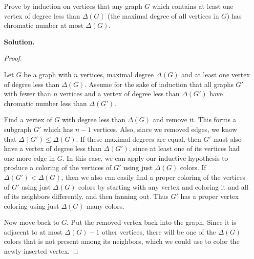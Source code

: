 \documentclass{book}
\begin{document}
\setcounter{project}{46}
\addtocounter{project}{-1}
\begin{activity}[]\label{activity-39}
\hypertarget{p-411}{}%
Prove by induction on vertices that any graph \(G\) which contains at least one vertex of degree less than \(\Delta(G)\) (the maximal degree of all vertices in \(G\)) has chromatic number at most \(\Delta(G)\).%
\par\smallskip%
\noindent\textbf{Solution.}\hypertarget{solution-35}{}\quad%
\begin{proof}\hypertarget{proof-5}{}
\hypertarget{p-412}{}%
Let \(G\) be a graph with \(n\) vertices, maximal degree \(\Delta(G)\) and at least one vertex of degree less than \(\Delta(G)\). Assume for the sake of induction that all graphs \(G'\) with fewer than \(n\) vertices and a vertex of degree less than \(\Delta(G')\) have chromatic number less than \(\Delta(G')\).%
\par
\hypertarget{p-413}{}%
Find a vertex of \(G\) with degree less than \(\Delta(G)\) and remove it. This forms a subgraph \(G'\) which has \(n-1\) vertices. Also, since we removed edges, we know that \(\Delta(G') \le \Delta(G)\). If these maximal degrees are equal, then \(G'\) must also have a vertex of degree less than \(\Delta(G')\), since at least one of its vertices had one more edge in \(G\). In this case, we can apply our inductive hypothesis to produce a coloring of the vertices of \(G'\) using just \(\Delta(G)\) colors. If \(\Delta(G') \lt  \Delta(G)\), then we also can easily find a proper coloring of the vertices of \(G'\) using just \(\Delta(G)\) colors by starting with any vertex and coloring it and all of its neighbors differently, and then fanning out. Thus \(G'\) has a proper vertex coloring using just \(\Delta(G)\)-many colors.%
\par
\hypertarget{p-414}{}%
Now move back to \(G\). Put the removed vertex back into the graph. Since it is adjacent to at most \(\Delta(G) - 1\) other vertices, there will be one of the \(\Delta(G)\) colors that is not present among its neighbors, which we could use to color the newly inserted vertex.%
\end{proof}
\end{activity}

\clearpage
\end{document}
